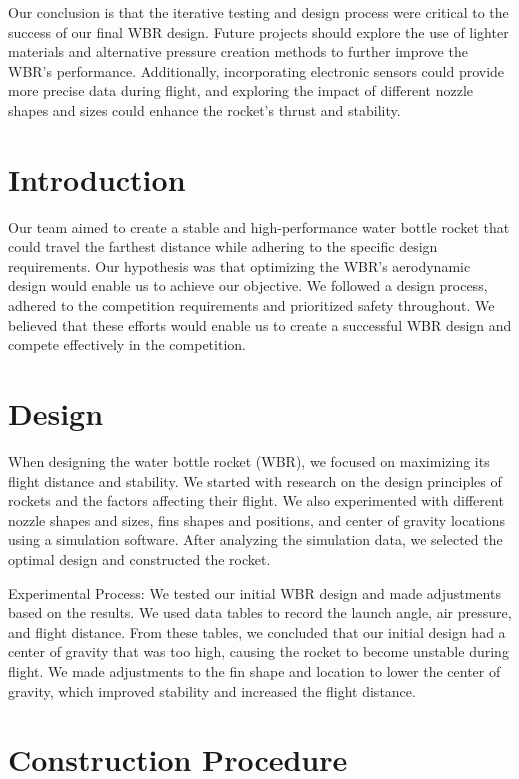 \documentclass[11pt]{article}
\begin{document}
Our conclusion is that the iterative testing and design process were critical to the success of our final WBR design. Future projects should explore the use of lighter materials and alternative pressure creation methods to further improve the WBR's performance. Additionally, incorporating electronic sensors could provide more precise data during flight, and exploring the impact of different nozzle shapes and sizes could enhance the rocket's thrust and stability.


\section{Introduction}

Our team aimed to create a stable and high-performance water bottle rocket that could travel the farthest distance while adhering to the specific design requirements. Our hypothesis was that optimizing the WBR's aerodynamic design would enable us to achieve our objective. We followed a design process, adhered to the competition requirements and prioritized safety throughout. We believed that these efforts would enable us to create a successful WBR design and compete effectively in the competition.

\section{Design}
When designing the water bottle rocket (WBR), we focused on maximizing its flight distance and stability. We started with research on the design principles of rockets and the factors affecting their flight. We also experimented with different nozzle shapes and sizes, fins shapes and positions, and center of gravity locations using a simulation software. After analyzing the simulation data, we selected the optimal design and constructed the rocket.

Experimental Process:
We tested our initial WBR design and made adjustments based on the results. We used data tables to record the launch angle, air pressure, and flight distance. From these tables, we concluded that our initial design had a center of gravity that was too high, causing the rocket to become unstable during flight. We made adjustments to the fin shape and location to lower the center of gravity, which improved stability and increased the flight distance.

\section{Construction Procedure}
\end{document}
